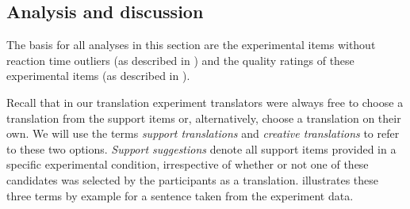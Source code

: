 \documentclass[output=paper]{LSP/langsci}
\begin{document}
\subsection{Analysis and discussion}
\label{sec:kremer:qr-analysis-discussion}

The basis for all analyses in this section are the experimental items
without reaction time outliers (as described in
) and the quality ratings of
these experimental items (as described in
).



Recall that in our translation experiment
translators were always free to choose a translation from the support
items or, alternatively, choose a translation on their own. We will
use the terms \textit{support translations} and \textit{creative
  translations} to refer to these two options.  \textit{Support
  suggestions} denote all support items provided in a specific
experimental condition, irrespective of whether or not one of these
candidates was selected by the participants as a translation.
 illustrates these three terms by
example for a sentence taken from the experiment data.
\end{document}

